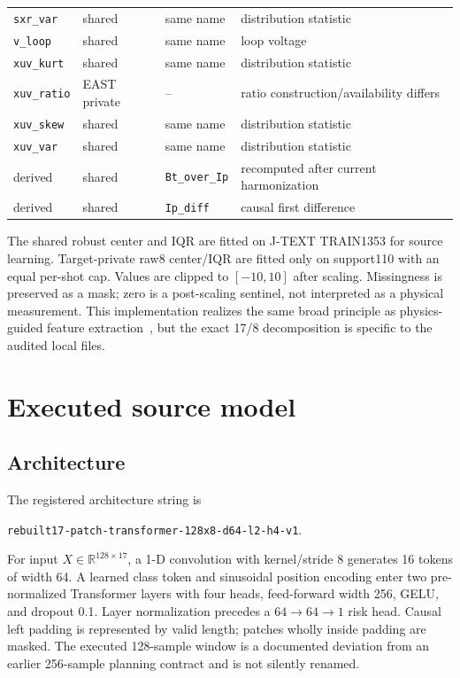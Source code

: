 \documentclass[10pt]{article}
\newcommand{\jtext}{J-TEXT}
\newcommand{\east}{EAST}
\newcommand{\code}[1]{\nolinkurl{#1}}
\begin{document}
\begin{longtable}{@{}p{28mm}p{27mm}p{31mm}p{68mm}@{}}
\code{sxr\_var} & shared & same name & distribution statistic \\
\code{v\_loop} & shared & same name & loop voltage \\
\code{xuv\_kurt} & shared & same name & distribution statistic \\
\code{xuv\_ratio} & \east{} private & -- & ratio construction/availability differs \\
\code{xuv\_skew} & shared & same name & distribution statistic \\
\code{xuv\_var} & shared & same name & distribution statistic \\
derived & shared & \code{Bt\_over\_Ip} & recomputed after current harmonization \\
derived & shared & \code{Ip\_diff} & causal first difference \\
\bottomrule
\end{longtable}

The shared robust center and IQR are fitted on \jtext{} TRAIN1353 for source learning.  Target-private raw8 center/IQR are fitted only on support110 with an equal per-shot cap.  Values are clipped to $[-10,10]$ after scaling.  Missingness is preserved as a mask; zero is a post-scaling sentinel, not interpreted as a physical measurement.  This implementation realizes the same broad principle as physics-guided feature extraction~\citep{zheng2023transfer,shen2023pgfeda}, but the exact 17/8 decomposition is specific to the audited local files.

\section{Executed source model}

\subsection{Architecture}

The registered architecture string is
\begin{center}
\code{rebuilt17-patch-transformer-128x8-d64-l2-h4-v1}.
\end{center}
For input $X\in\mathbb{R}^{128\times17}$, a 1-D convolution with kernel/stride 8 generates 16 tokens of width 64.  A learned class token and sinusoidal position encoding enter two pre-normalized Transformer layers with four heads, feed-forward width 256, GELU, and dropout 0.1.  Layer normalization precedes a $64\rightarrow64\rightarrow1$ risk head.  Causal left padding is represented by valid length; patches wholly inside padding are masked.  The executed 128-sample window is a documented deviation from an earlier 256-sample planning contract and is not silently renamed.
\end{document}
